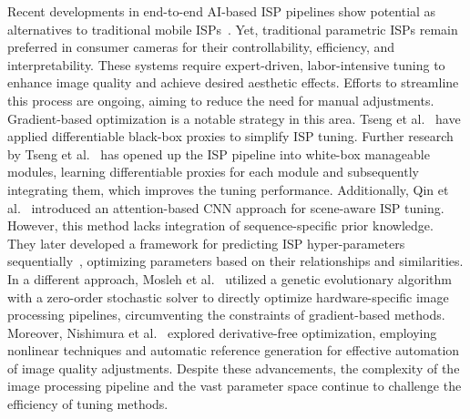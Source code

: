 \documentclass{article}
\begin{document}
Recent developments in end-to-end AI-based ISP pipelines show potential as alternatives to traditional mobile ISPs~\cite{ignatov2020replacing, jeong2022rawtobit, shekhar2022transform}. Yet, traditional parametric ISPs remain preferred in consumer cameras for their controllability, efficiency, and interpretability. These systems require expert-driven, labor-intensive tuning to enhance image quality and achieve desired aesthetic effects. Efforts to streamline this process are ongoing, aiming to reduce the need for manual adjustments.
Gradient-based optimization is a notable strategy in this area. Tseng et al.~\cite{tseng2019hyperparameter} have applied differentiable black-box proxies to simplify ISP tuning. %
Further research by Tseng et al.~\cite{tseng2022neural} has opened up the ISP pipeline into white-box manageable modules, learning differentiable proxies for each module and subsequently integrating them, which improves the tuning performance.
Additionally, Qin et al.~\cite{qin2022attention} introduced an attention-based CNN approach for scene-aware ISP tuning. However, this method lacks integration of sequence-specific prior knowledge. They later developed a framework for predicting ISP hyper-parameters sequentially~\cite{qin2023learning}, optimizing parameters based on their relationships and similarities.
In a different approach, Mosleh et al.~\cite{mosleh2020hardware} utilized a genetic evolutionary algorithm with a zero-order stochastic solver\cite{hansen2006cma} to directly optimize hardware-specific image processing pipelines, circumventing the constraints of gradient-based methods.
Moreover, Nishimura et al.~\cite{nishimura2018automatic} explored derivative-free optimization, employing nonlinear techniques and automatic reference generation for effective automation of image quality adjustments.
Despite these advancements, the complexity of the image processing pipeline and the vast parameter space continue to challenge the efficiency of tuning methods.
\end{document}
